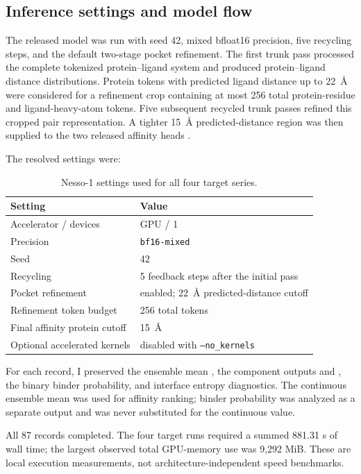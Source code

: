 \documentclass[11pt]{article}
\begin{document}
\subsection{Inference settings and model flow}

The released model was run with seed 42, mixed bfloat16 precision, five
recycling steps, and the default two-stage pocket refinement. The first trunk
pass processed the complete tokenized protein--ligand system and produced
protein--ligand distance distributions. Protein tokens with predicted ligand
distance up to 22~\AA{} were considered for a refinement crop containing at
most 256 total protein-residue and ligand-heavy-atom tokens. Five subsequent
recycled trunk passes refined this cropped pair representation. A tighter
15~\AA{} predicted-distance region was then supplied to the two released
affinity heads \citep{shenoy2026nesso1}.

The resolved settings were:
\begin{table}[H]
\centering
\small
\begin{tabular}{L{2.25in}L{3.85in}}
\toprule
Setting & Value \\
\midrule
Accelerator / devices & GPU / 1 \\
Precision & \texttt{bf16-mixed} \\
Seed & 42 \\
Recycling & 5 feedback steps after the initial pass \\
Pocket refinement & enabled; 22~\AA{} predicted-distance cutoff \\
Refinement token budget & 256 total tokens \\
Final affinity protein cutoff & 15~\AA{} \\
Optional accelerated kernels & disabled with \texttt{--no\_kernels} \\
\bottomrule
\end{tabular}
\caption{Nesso-1 settings used for all four target series.}
\end{table}

For each record, I preserved the ensemble mean
, the component outputs
 and , the
binary binder probability, and interface entropy diagnostics. The continuous
ensemble mean was used for affinity ranking; binder probability was analyzed
as a separate output and was never substituted for the continuous value.

All 87 records completed. The four target runs required a summed 881.31 s of
wall time; the largest observed total GPU-memory use was 9,292 MiB. These are
local execution measurements, not architecture-independent speed benchmarks.
\end{document}
